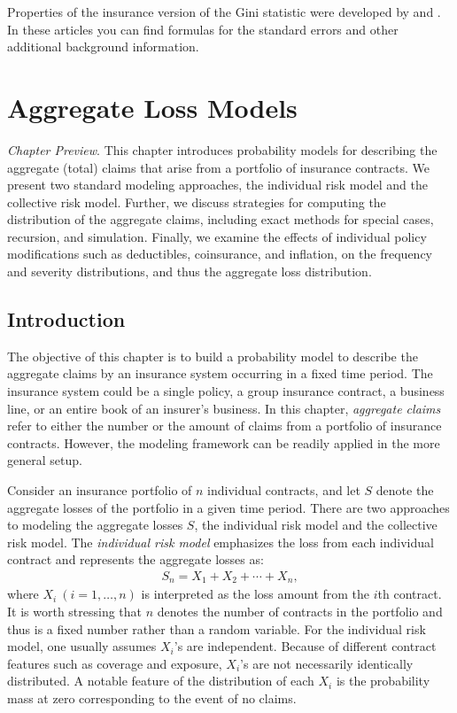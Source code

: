 \documentclass[]{book}
\theoremstyle{definition}
\theoremstyle{definition}
\theoremstyle{definition}
\theoremstyle{remark}
\begin{document}
Properties of the insurance version of the Gini statistic were developed
by \citep{frees2011summarizing} and \citep{frees2014insurance}. In these
articles you can find formulas for the standard errors and other
additional background information.

\chapter{Aggregate Loss Models}\label{C:AggLossModels}

\emph{Chapter Preview}. This chapter introduces probability models for
describing the aggregate (total) claims that arise from a portfolio of
insurance contracts. We present two standard modeling approaches, the
individual risk model and the collective risk model. Further, we discuss
strategies for computing the distribution of the aggregate claims,
including exact methods for special cases, recursion, and simulation.
Finally, we examine the effects of individual policy modifications such
as deductibles, coinsurance, and inflation, on the frequency and
severity distributions, and thus the aggregate loss distribution.

\section{Introduction}\label{introduction}

The objective of this chapter is to build a probability model to
describe the aggregate claims by an insurance system occurring in a
fixed time period. The insurance system could be a single policy, a
group insurance contract, a business line, or an entire book of an
insurer's business. In this chapter, \emph{aggregate claims} refer to
either the number or the amount of claims from a portfolio of insurance
contracts. However, the modeling framework can be readily applied in the
more general setup.

Consider an insurance portfolio of \(n\) individual contracts, and let
\(S\) denote the aggregate losses of the portfolio in a given time
period. There are two approaches to modeling the aggregate losses \(S\),
the individual risk model and the collective risk model. The
\emph{individual risk model} emphasizes the loss from each individual
contract and represents the aggregate losses as: \[\begin{aligned}
S_n=X_1 +X_2 +\cdots+X_n,
\end{aligned}\] where \(X_i~(i=1,\ldots,n)\) is interpreted as the loss
amount from the \(i\)th contract. It is worth stressing that \(n\)
denotes the number of contracts in the portfolio and thus is a fixed
number rather than a random variable. For the individual risk model, one
usually assumes \(X_{i}\)'s are independent. Because of different
contract features such as coverage and exposure, \(X_{i}\)'s are not
necessarily identically distributed. A notable feature of the
distribution of each \(X_i\) is the probability mass at zero
corresponding to the event of no claims.
\end{document}
